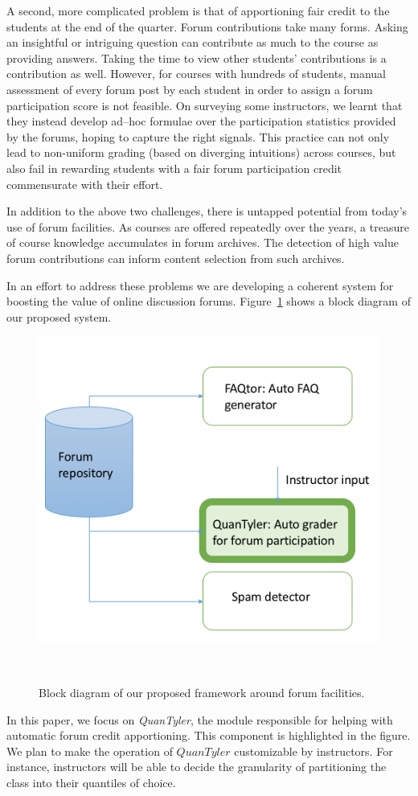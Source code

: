 A second, more complicated problem is that of apportioning fair credit
to the students at the end of the quarter. Forum contributions take many
forms. Asking an insightful or intriguing question can contribute as
much to the course as providing answers. Taking the time to view
other students' contributions is a contribution as well. However, for courses
with hundreds of students, manual assessment of every forum post by
each student in order to assign a forum participation score is not
feasible. On surveying some instructors, we learnt that they instead develop ad--hoc formulae over the participation
statistics provided by the forums, hoping to capture the right signals. This
practice can not only lead to non-uniform grading (based on
diverging intuitions) across courses, but also fail in rewarding students with a fair forum participation credit commensurate with their effort.

In addition to the above two challenges, there is untapped potential
from today's use of forum facilities. As courses are offered
repeatedly over the years, a treasure of course knowledge accumulates
in forum archives. The detection of high value forum contributions can
inform content selection from such archives.

In an effort to address these problems we are developing a coherent
system for boosting the value of online discussion
forums. Figure~\ref{fig:arch} shows a block diagram of our proposed
system.
\begin{figure}
\centering
\includegraphics[width=0.6\columnwidth]{Figs/systemBlockDiagram.png}
  \caption{Block diagram of our proposed framework around forum facilities.}
  ~\label{fig:arch}
\end{figure}
In this paper, we focus on {\em QuanTyler}, the module responsible for helping with automatic forum credit
apportioning. This component is highlighted in the figure. We plan to make the operation of $QuanTyler$ customizable by instructors. For instance, instructors will
be able to decide the granularity of partitioning the class into their
quantiles of choice. 

